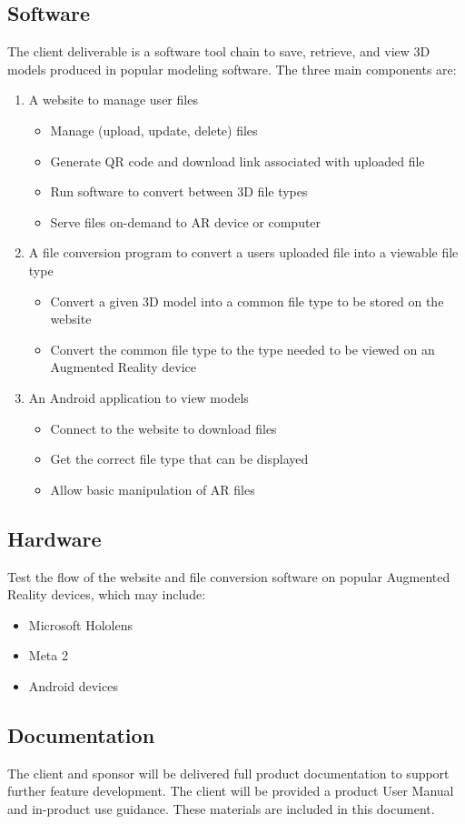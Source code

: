 \subsection{Software}
The client deliverable is a software tool chain to save, retrieve, and view 3D models produced in popular modeling software. The three main components are:

\begin{enumerate}
	\item A website to manage user files
		\begin{itemize}
			\item Manage (upload, update, delete) files
			\item Generate QR code and download link associated with uploaded file
			\item Run software to convert between 3D file types
			\item Serve files on-demand to AR device or computer 
		\end{itemize}
	\item A file conversion program to convert a users uploaded file into a viewable file type
		\begin{itemize}
			\item Convert a given 3D model into a common file type to be stored on the website
			\item Convert the common file type to the type needed to be viewed on an Augmented Reality device
		\end{itemize}
	\item An Android application to view models
		\begin{itemize}
			\item Connect to the website to download files
			\item Get the correct file type that can be displayed
			\item Allow basic manipulation of AR files
		\end{itemize}
\end{enumerate}

\subsection{Hardware}

Test the flow of the website and file conversion software on popular Augmented Reality devices, which may include:
\begin{itemize}
	\item Microsoft Hololens
	\item Meta 2
	\item Android devices
\end{itemize}

\subsection{Documentation}

The client and sponsor will be delivered full product documentation to support further feature development. The client will be provided a product User Manual and in-product use guidance.  These materials are included in this document. 
